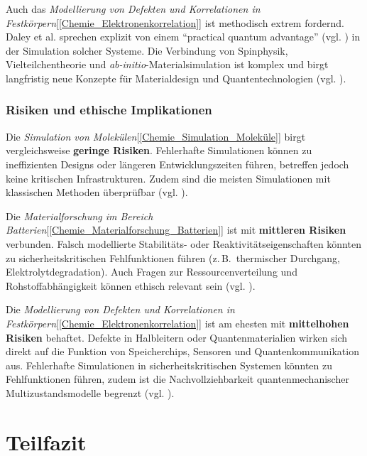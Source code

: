 \vspace{0.5em}

Auch das \textit{Modellierung von Defekten und Korrelationen in Festkörpern}[\ref{Chemie_Elektronenkorrelation}] ist methodisch extrem fordernd. Daley et al. sprechen explizit von einem ``practical quantum advantage'' (vgl. \cite{daley_practical_2022}) in der Simulation solcher Systeme. Die Verbindung von Spinphysik, Vielteilchentheorie und \textit{ab-initio}-Materialsimulation ist komplex und birgt langfristig neue Konzepte für Materialdesign und Quantentechnologien (vgl. \cite{bassett_quantum_2019}).


\subsubsection{Risiken und ethische Implikationen}

Die \textit{Simulation von Molekülen}[\ref{Chemie_Simulation_Moleküle}] birgt vergleichsweise \textbf{geringe Risiken}. Fehlerhafte Simulationen können zu ineffizienten Designs oder längeren Entwicklungszeiten führen, betreffen jedoch keine kritischen Infrastrukturen. Zudem sind die meisten Simulationen mit klassischen Methoden überprüfbar (vgl. \cite{mcardle_quantum_2020}).

\vspace{0.5em}

Die \textit{Materialforschung im Bereich Batterien}[\ref{Chemie_Materialforschung_Batterien}] ist mit \textbf{mittleren Risiken} verbunden. Falsch modellierte Stabilitäts- oder Reaktivitätseigenschaften könnten zu sicherheitskritischen Fehlfunktionen führen (z.\,B.\ thermischer Durchgang, Elektrolytdegradation). Auch Fragen zur Ressourcenverteilung und Rohstoffabhängigkeit können ethisch relevant sein (vgl. \cite{demirApplicationQuantumComputing2024}).

\vspace{0.5em}

Die \textit{Modellierung von Defekten und Korrelationen in Festkörpern}[\ref{Chemie_Elektronenkorrelation}] ist am ehesten mit \textbf{mittelhohen Risiken} behaftet. Defekte in Halbleitern oder Quantenmaterialien wirken sich direkt auf die Funktion von Speicherchips, Sensoren und Quantenkommunikation aus. Fehlerhafte Simulationen in sicherheitskritischen Systemen könnten zu Fehlfunktionen führen, zudem ist die Nachvollziehbarkeit quantenmechanischer Multizustandsmodelle begrenzt (vgl. \cite{orus_quantum_2019,freysoldt_first-principles_2014}).


\section{Teilfazit}


\printbibliography

